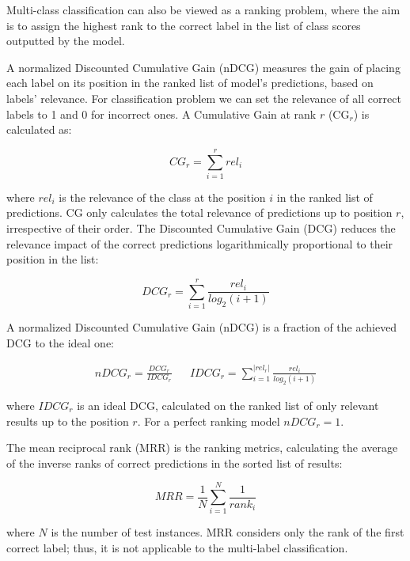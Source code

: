 Multi-class classification can also be viewed as a ranking problem, where the aim is to assign the highest rank to the correct label in the list of class scores outputted by the model. 

 A normalized Discounted Cumulative Gain (nDCG) measures the gain of placing each label on its position in the ranked list of model's predictions, based on labels' relevance. For classification problem we can set the relevance of all correct labels to 1 and 0 for incorrect ones. A Cumulative Gain at rank $r$ (CG$_r$) is calculated as:

\begin{equation}
    CG_r = \sum_{i=1}^r rel_i
\end{equation}

where $rel_i$ is the relevance of the class at the position $i$ in the ranked list of predictions. CG only calculates the total relevance of predictions up to position $r$, irrespective of their order. The Discounted Cumulative Gain (DCG) reduces the relevance impact of the correct predictions logarithmically proportional to their position in the list:

\begin{equation}
    DCG_r = \sum_{i=1}^r \frac{rel_i}{log_2(i+1)}
\end{equation}

A normalized Discounted Cumulative Gain (nDCG) is a fraction of the achieved DCG to the ideal one:

\begin{align}
    nDCG_r = \frac{DCG_r}{IDCG_r} && IDCG_r = \sum_{i=1}^{|rel_r|} \frac{rel_i}{log_2(i+1)}
\end{align}

where $IDCG_r$ is an ideal DCG, calculated on the ranked list of only relevant results up to the position $r$. For a perfect ranking model $nDCG_r = 1$.

 The mean reciprocal rank (MRR) is the ranking metrics, calculating the average of the inverse ranks of correct predictions in the sorted list of results:

\begin{equation}
    MRR = \frac{1}{N} \sum_{i=1}^N \frac{1}{rank_i}
\end{equation}

where $N$ is the number of test instances. MRR considers only the rank of the first correct label; thus, it is not applicable to the multi-label classification.

